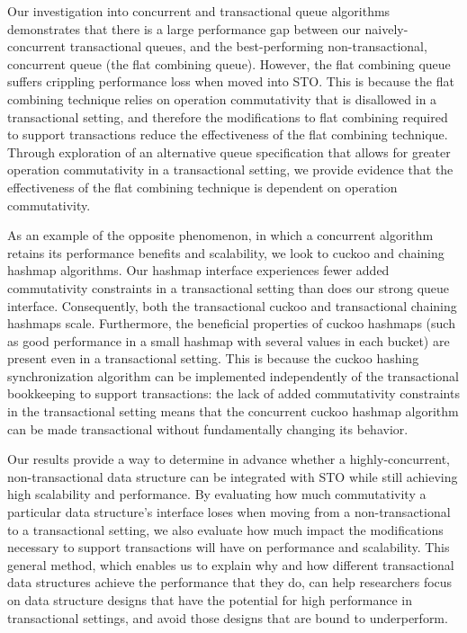 Our investigation into concurrent and transactional queue algorithms demonstrates that there is a large performance gap between our naively-concurrent transactional queues, and the best-performing non-transactional, concurrent queue (the flat combining queue). However, the flat combining queue suffers crippling performance loss when moved into STO. This is because the flat combining technique relies on operation commutativity that is disallowed in a transactional setting, and therefore the modifications to flat combining required to support transactions reduce the effectiveness of the flat combining technique. Through exploration of an alternative queue specification that allows for greater operation commutativity in a transactional setting, we provide evidence that the effectiveness of the flat combining technique is dependent on operation commutativity.

As an example of the opposite phenomenon, in which a concurrent algorithm retains its performance benefits and scalability, we look to cuckoo and chaining hashmap algorithms. Our hashmap interface experiences fewer added commutativity constraints in a transactional setting than does our strong queue interface. Consequently, both the transactional cuckoo and transactional chaining hashmaps scale.
Furthermore, the beneficial properties of cuckoo hashmaps (such as good performance in a small hashmap with several values in each bucket) are present even in a transactional setting. This is because the cuckoo hashing synchronization algorithm can be implemented independently of the transactional bookkeeping to support transactions: the lack of added commutativity constraints in the transactional setting means that the concurrent cuckoo hashmap algorithm can be made transactional without fundamentally changing its behavior.

Our results provide a way to determine in advance whether a highly-concurrent, non-transactional data structure can be integrated with STO while still achieving high scalability and performance. By evaluating how much commutativity a particular data structure's interface loses when moving from a non-transactional to a transactional setting, we also evaluate how much impact the modifications necessary to support transactions will have on performance and scalability. 
This general method, which enables us to explain why and how different transactional data structures achieve the performance that they do, can help researchers focus on data structure designs that have the potential for high performance in transactional settings, and avoid those designs that are bound to underperform.
